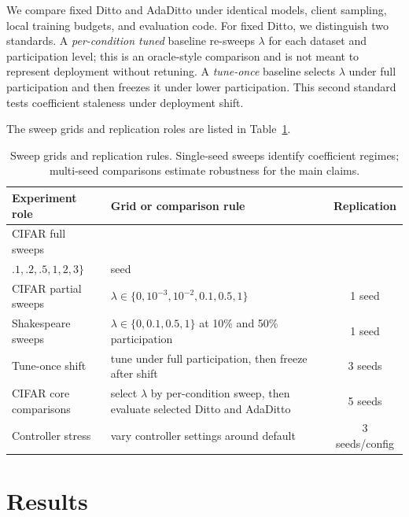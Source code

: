 \documentclass[letterpaper]{article} %
\begin{document}
We compare fixed Ditto and AdaDitto under identical models, client
sampling, local training budgets, and evaluation code. For fixed
Ditto, we distinguish two standards. A \emph{per-condition tuned}
baseline re-sweeps $\lambda$ for each dataset and participation level;
this is an oracle-style comparison and is not meant to represent
deployment without retuning. A \emph{tune-once} baseline selects
$\lambda$ under full participation and then freezes it under lower
participation. This second standard tests coefficient staleness under
deployment shift.

The sweep grids and replication roles are listed in
Table~\ref{tab:sweep-protocol}.

\begin{table}[t]
\centering
\scriptsize
\setlength{\tabcolsep}{3pt}
\renewcommand{\arraystretch}{1.08}
\begin{tabularx}{\columnwidth}{@{}>{\raggedright\arraybackslash}p{}>{\raggedright\arraybackslash}Xc@{}}
\toprule
Experiment role & Grid or comparison rule & Replication \\
\midrule
CIFAR full sweeps &
\begin{tabular}[t]{@{}l@{}}
$\{0,.001,.005,.01,.03,.05,.08,$\\
$.1,.2,.5,1,2,3\}$
\end{tabular} &
1 seed \\
CIFAR partial sweeps &
$\lambda\in\{0,10^{-3},10^{-2},0.1,0.5,1\}$ &
1 seed \\
Shakespeare sweeps &
$\lambda\in\{0,0.1,0.5,1\}$ at 10\% and 50\% participation &
1 seed \\
Tune-once shift &
tune under full participation, then freeze after shift &
3 seeds \\
CIFAR core comparisons &
select $\lambda$ by per-condition sweep, then evaluate selected Ditto and AdaDitto &
5 seeds \\
Controller stress &
vary controller settings around default &
3 seeds/config \\
\bottomrule
\end{tabularx}
\caption{Sweep grids and replication rules. Single-seed sweeps identify coefficient regimes; multi-seed comparisons estimate robustness for the main claims.}
\label{tab:sweep-protocol}
\end{table}

\section{Results}
\end{document}
